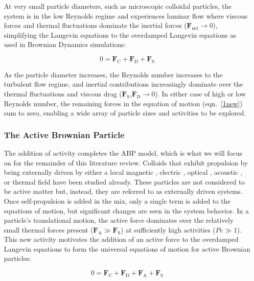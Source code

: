 \documentclass[11pt]{article}
\begin{document}
At very small particle diameters, such as microscopic colloidal particles, the system is in the low Reynolds regime and experiences laminar flow where viscous forces and thermal fluctuations dominate the inertial forces ($\boldsymbol{F}_{\text{net}} \rightarrow 0$), simplifying the Langevin equations to the overdamped Langevin equations as used in Brownian Dynamics simulations:

\begin{equation}\label{1new}
    0=\boldsymbol{F}_{\text{C}}+\boldsymbol{F}_{\text{D}}+\boldsymbol{F}_{\text{S}}
\end{equation}

\noindent As the particle diameter increases, the Reynolds number increases to the turbulent flow regime, and inertial contributions increasingly dominate over the thermal fluctuations and viscous drag ($\boldsymbol{F}_{\text{S}}$,$\boldsymbol{F}_{\text{D}} \rightarrow 0$). In either case of high or low Reynolds number, the remaining forces in the equation of motion (eqn.~\ref{1new}) sum to zero, enabling a wide array of particle sizes and activities to be explored.

\subsubsection{The Active Brownian Particle}\label{ABPactivity}


The addition of activity completes the ABP model, which is what we will focus on for the remainder of this literature review.  Colloids that exhibit propulsion by being externally driven by either a local magnetic \cite{Yan}, electric \cite{Gangwal, Yan2}, optical \cite{Stenhammar, Palacci, Palacci2}, acoustic \cite{Jiang}, or thermal field \cite{Buttinoni} have been studied already.  These particles are not considered to be active matter but, instead, they are referred to as externally driven systems. Once self-propulsion is added in the mix, only a single term is added to the equations of motion, but significant changes are seen in the system behavior.  In a particle's translational motion, the active force dominates over the relatively small thermal forces present ($\boldsymbol{F}_\text{A}\gg\boldsymbol{F}_\text{S}$) at sufficiently high activities ($Pe\gg1$).  This new activity motivates the addition of an active force to the overdamped Langevin equations to form the universal equations of motion for active Brownian particles:

\begin{equation}\label{1}
    0=\boldsymbol{F}_{\text{C}}+\boldsymbol{F}_{\text{D}}+\boldsymbol{F}_{\text{A}}+\boldsymbol{F}_{\text{S}}
\end{equation}
\end{document}
